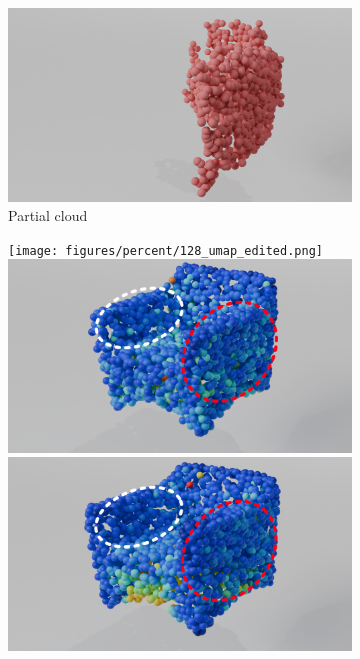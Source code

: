 \begin{figure}[htb]
\begin{subfigure}[t]{\textwidth+20pt\relax}
            \includegraphics[width=\dimexpr\linewidth-20pt\relax]{figures/percent/1024_part.png}
            \caption{Partial cloud}\label{fig:partialpercentchair1}
          \end{subfigure}\hfill
          \begin{subfigure}[t]{0.315\textwidth}
            \texttt{[image: figures/percent/128\_umap\_edited.png]}
            \includegraphics[width=\textwidth]{figures/percent/256_umap_edited.png}
            \includegraphics[width=\textwidth]{figures/percent/512_umap_edited.png}

\end{subfigure}
\end{figure}

